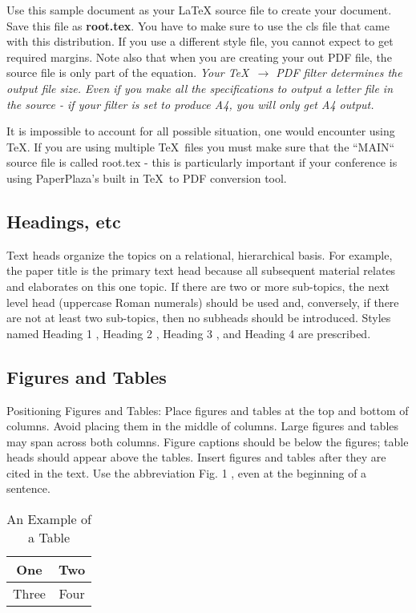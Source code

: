 \documentclass[letterpaper, 10 pt, conference]{ieeeconf}  %
\begin{document}
Use this sample document as your LaTeX source file to create your document. Save this file as {\bf root.tex}. You have to make sure to use the cls file that came with this distribution. If you use a different style file, you cannot expect to get required margins. Note also that when you are creating your out PDF file, the source file is only part of the equation. {\it Your \TeX\ $\rightarrow$ PDF filter determines the output file size. Even if you make all the specifications to output a letter file in the source - if your filter is set to produce A4, you will only get A4 output. }

It is impossible to account for all possible situation, one would encounter using \TeX. If you are using multiple \TeX\ files you must make sure that the ``MAIN`` source file is called root.tex - this is particularly important if your conference is using PaperPlaza's built in \TeX\ to PDF conversion tool.

\subsection{Headings, etc}

Text heads organize the topics on a relational, hierarchical basis. For example, the paper title is the primary text head because all subsequent material relates and elaborates on this one topic. If there are two or more sub-topics, the next level head (uppercase Roman numerals) should be used and, conversely, if there are not at least two sub-topics, then no subheads should be introduced. Styles named  Heading 1 ,  Heading 2 ,  Heading 3 , and  Heading 4  are prescribed.

\subsection{Figures and Tables}

Positioning Figures and Tables: Place figures and tables at the top and bottom of columns. Avoid placing them in the middle of columns. Large figures and tables may span across both columns. Figure captions should be below the figures; table heads should appear above the tables. Insert figures and tables after they are cited in the text. Use the abbreviation  Fig. 1 , even at the beginning of a sentence.

\begin{table}[h]
\caption{An Example of a Table}
\label{table_example}
\begin{center}
\begin{tabular}{|c||c|}
\hline
One & Two\\
\hline
Three & Four\\
\hline
\end{tabular}
\end{center}
\end{table}
\end{document}
